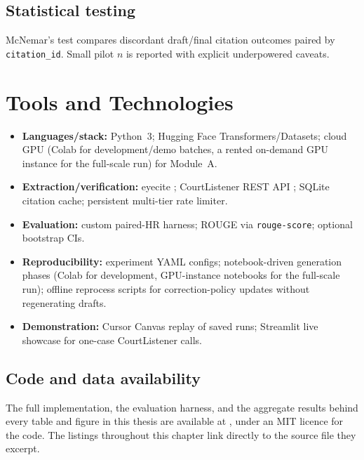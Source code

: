 \subsection{Statistical testing}
McNemar's test \cite{mcnemar1947} compares discordant draft/final citation outcomes paired by \texttt{citation\_id}. Small pilot $n$ is reported with explicit underpowered caveats.

\section{Tools and Technologies}
\label{sec:tools}

\begin{itemize}
  \item \textbf{Languages/stack:} Python~3; Hugging Face Transformers/Datasets; cloud GPU (Colab for development/demo batches, a rented on-demand GPU instance for the full-scale run) for Module~A.
  \item \textbf{Extraction/verification:} eyecite \cite{eyecite2021}; CourtListener REST API \cite{courtlistener_api}; SQLite citation cache; persistent multi-tier rate limiter.
  \item \textbf{Evaluation:} custom paired-HR harness; ROUGE via \texttt{rouge-score}; optional bootstrap CIs.
  \item \textbf{Reproducibility:} experiment YAML configs; notebook-driven generation phases (Colab for development, GPU-instance notebooks for the full-scale run); offline reprocess scripts for correction-policy updates without regenerating drafts.
  \item \textbf{Demonstration:} Cursor Canvas replay of saved runs; Streamlit live showcase for one-case CourtListener calls.
\end{itemize}

\subsection{Code and data availability}
\label{sec:method-availability}

The full implementation, the evaluation harness, and the aggregate results behind every table and figure in this thesis are available at \href{\repourl}{\repourl}, under an MIT licence for the code. The listings throughout this chapter link directly to the source file they excerpt.

